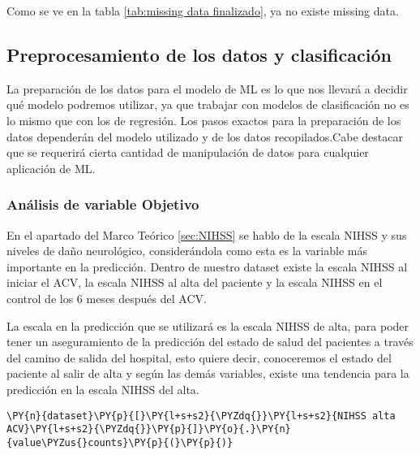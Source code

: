     Como se ve en la tabla \ref{tab:missing data finalizado}, ya no existe missing data.

    \hypertarget{preprocesamiento-de-los-datos-y-clasificaciuxf3n}{%
\subsection{Preprocesamiento de los datos y clasificación}\label{preprocesamiento-de-los-datos-y-clasificaciuxf3n}}

La preparación de los datos para el modelo de ML es lo que nos llevará a decidir qué modelo podremos utilizar, ya que trabajar con modelos de clasificación no es lo mismo que con los de regresión. Los pasos exactos para la preparación de los datos dependerán del modelo utilizado y de los datos recopilados.Cabe destacar que se requerirá cierta cantidad de manipulación de datos para cualquier aplicación de ML.

    \hypertarget{anuxe1lisis-de-variable-objetivo}{%
\subsubsection{Análisis de variable Objetivo}\label{anuxe1lisis-de-variable-objetivo}}

	En el apartado del Marco Teórico \ref{sec:NIHSS} se hablo de la escala NIHSS y sus niveles de daño neurológico, considerándola como esta es la variable más importante en la predicción. Dentro de nuestro dataset existe la escala NIHSS al iniciar el ACV, la escala NIHSS al alta del paciente y la escala NIHSS en el control de los 6 meses después del ACV.
\par La escala en la predicción que se utilizará es la escala NIHSS de alta, para poder tener un aseguramiento de la predicción del estado de salud del pacientes a través del camino de salida del hospital, esto quiere decir, conoceremos el estado del paciente al salir de alta y según las demás variables, existe una tendencia para la predicción en la escala NIHSS del alta.

    \begin{tcolorbox}[breakable, size=fbox, boxrule=1pt, pad at break*=1mm,colback=cellbackground, colframe=cellborder]
\begin{Verbatim}[commandchars=\\\{\}]
\PY{n}{dataset}\PY{p}{[}\PY{l+s+s2}{\PYZdq{}}\PY{l+s+s2}{NIHSS alta ACV}\PY{l+s+s2}{\PYZdq{}}\PY{p}{]}\PY{o}{.}\PY{n}{value\PYZus{}counts}\PY{p}{(}\PY{p}{)}
\end{Verbatim}
\end{tcolorbox}

